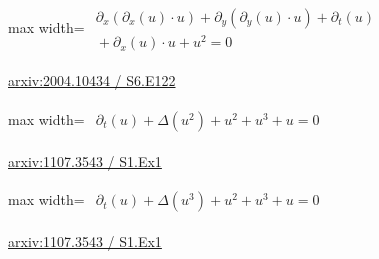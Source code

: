 \documentclass[UTF8,10pt,a4paper,fontset=mac]{ctexart}
\begin{document}
\begin{minipage}{\linewidth}\begin{center}\begin{adjustbox}{max width=\linewidth}$\displaystyle\begin{gathered}\begin{gathered}\partial_{x}(\partial_{x}(u)\cdot u)+\partial_{y}(\partial_{y}(u)\cdot u)+\partial_{t}(u)\\[-1pt]{}+\partial_{x}(u)\cdot u+u^{2}=0\end{gathered}\end{gathered}$\end{adjustbox}\end{center}{\small\href{https://arxiv.org/html/2004.10434#S6.E122}{arxiv:2004.10434 / S6.E122}}\par\end{minipage}\par\vspace{6mm}

\begin{minipage}{\linewidth}\begin{center}\begin{adjustbox}{max width=\linewidth}$\displaystyle\begin{gathered}\begin{gathered}\partial_{t}(u)+\Delta(u^{2})+u^{2}+u^{3}+u=0\end{gathered}\end{gathered}$\end{adjustbox}\end{center}{\small\href{https://arxiv.org/html/1107.3543#S1.Ex1}{arxiv:1107.3543 / S1.Ex1}}\par\end{minipage}\par\vspace{6mm}

\begin{minipage}{\linewidth}\begin{center}\begin{adjustbox}{max width=\linewidth}$\displaystyle\begin{gathered}\begin{gathered}\partial_{t}(u)+\Delta(u^{3})+u^{2}+u^{3}+u=0\end{gathered}\end{gathered}$\end{adjustbox}\end{center}{\small\href{https://arxiv.org/html/1107.3543#S1.Ex1}{arxiv:1107.3543 / S1.Ex1}}\par\end{minipage}\par\vspace{6mm}
\end{document}
